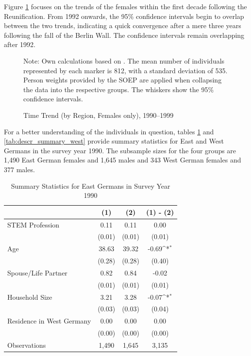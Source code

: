 \documentclass[a4paper, oneside, hyperfootnotes = false]{article}
\def\sym#1{\ifmmode^{#1}\else\(^{#1}\)\fi}
\begin{document}
{Figure \ref{fig:timetrendzoom} focuses on the trends of the females within the first decade following the Reunification.
From 1992 onwards, the 95\% confidence intervals begin to overlap between the two trends, indicating a quick convergence after a mere three years following the fall of the Berlin Wall.
The confidence intervals remain overlapping after 1992.

\begin{figure}[ht]
	\centering
	\caption{Time Trend (by Region, Females only), 1990--1999}
	\label{fig:timetrendzoom}
	\fontsize{9pt}{11pt}\selectfont
	\def\svgwidth{.9\textwidth}
	
	\vspace{2mm}
	\parbox{10cm}{
		\linespread{1}\footnotesize Note: Own calculations based on \cite{SOEP2023}. The mean number of individuals represented by each marker is 812, with a standard deviation of 535. Person weights provided by the SOEP are applied when collapsing the data into the respective groups. The whiskers show the 95\% confidence intervals.}
\end{figure}

For a better understanding of the individuals in question, tables \ref{tab:descr_summary_east} and \ref{tab:descr_summary_west} provide summary statistics for East and West Germans in the survey year 1990.
The subsample sizes for the four groups are 1,490 East German females and 1,645 males and 343 West German females and 377 males.

\begin{table}[ht]
	\caption{Summary Statistics for East Germans in Survey Year 1990}
	\label{tab:descr_summary_east}
	\begin{center}
		\begin{tabular}{l*{3}{c}}
			\toprule
			& (1) & (2) & (1) - (2) \\
			\midrule
			STEM Profession & 0.11  & 0.11  &   0.00     \\
			&   (0.01)  & (0.01) & (0.01) \\
			\addlinespace
			Age         &   38.63   &  39.32  &  -0.69\sym{*}     \\
			&     (0.28) &        (0.28)         &      (0.40) \\
			\addlinespace
			Spouse/Life Partner &  0.82      &  0.84  &    -0.02    \\
			&      (0.01)&          (0.01)&         (0.01) \\
			\addlinespace
			Household Size      &  3.21   &  3.28   &   -0.07\sym{*}       \\
			&          (0.03)&       (0.03)        &      (0.04)\\
			\addlinespace
			Residence in West Germany&  0.00   &   0.00  &  0.00         \\
			&         (0.00) &       (0.00)&  (0.00)\\
			\midrule
			Observations        &  1,490    &    1,645     &      3,135             \\
			\bottomrule
		\end{tabular}
		

\end{center}
\end{table}}
\end{document}
